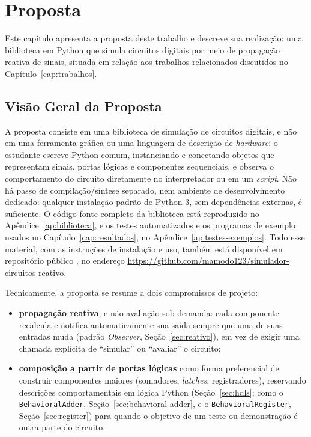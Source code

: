 \chapter{Proposta}
\label{cap:proposta}

Este capítulo apresenta a proposta deste trabalho e descreve sua realização: uma biblioteca em Python que simula circuitos digitais por meio de propagação reativa de sinais, situada em relação aos trabalhos relacionados discutidos no Capítulo~\ref{cap:trabalhos}.

\section{Visão Geral da Proposta}
\label{sec:visao-proposta}

A proposta consiste em uma biblioteca de simulação de circuitos digitais, e não em uma ferramenta gráfica ou uma linguagem de descrição de \textit{hardware}: o estudante escreve Python comum, instanciando e conectando objetos que representam sinais, portas lógicas e componentes sequenciais, e observa o comportamento do circuito diretamente no interpretador ou em um \textit{script}. Não há passo de compilação/síntese separado, nem ambiente de desenvolvimento dedicado: qualquer instalação padrão de Python 3, sem dependências externas, é suficiente. O código-fonte completo da biblioteca está reproduzido no Apêndice~\ref{ap:biblioteca}, e os testes automatizados e os programas de exemplo usados no Capítulo~\ref{cap:resultados}, no Apêndice~\ref{ap:testes-exemplos}. Todo esse material, com as instruções de instalação e uso, também está disponível em repositório público \cite{esteche2026}, no endereço \url{https://github.com/mamodo123/simulador-circuitos-reativo}.

Tecnicamente, a proposta se resume a dois compromissos de projeto:

\begin{itemize}
    \item \textbf{propagação reativa}, e não avaliação sob demanda: cada componente recalcula e notifica automaticamente sua saída sempre que uma de suas entradas muda (padrão \textit{Observer}, Seção~\ref{sec:reativo}), em vez de exigir uma chamada explícita de ``simular'' ou ``avaliar'' o circuito;
    \item \textbf{composição a partir de portas lógicas} como forma preferencial de construir componentes maiores (somadores, \textit{latches}, registradores), reservando descrições comportamentais em lógica Python (Seção~\ref{sec:hdls}; como o \texttt{BehavioralAdder}, Seção~\ref{sec:behavioral-adder}, e o \texttt{BehavioralRegister}, Seção~\ref{sec:register}) para quando o objetivo de um teste ou demonstração é outra parte do circuito.
\end{itemize}

